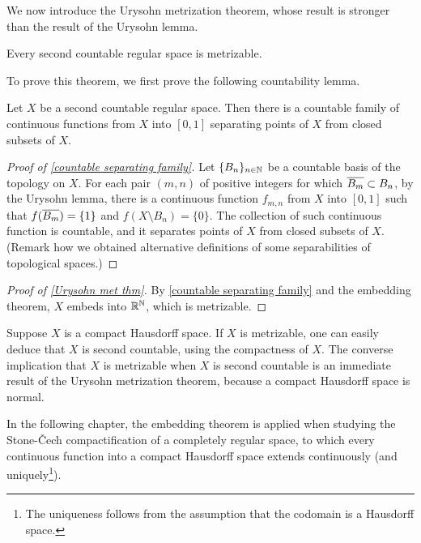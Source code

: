 We now introduce the Urysohn metrization theorem, whose result is stronger than the result of the Urysohn lemma.
\begin{thm}\label{Urysohn met thm}
    Every second countable regular space is metrizable.
\end{thm}
To prove this theorem, we first prove the following countability lemma.
\begin{lem}\label{countable separating family}
    Let $X$ be a second countable regular space.
    Then there is a countable family of continuous functions from $X$ into $[0, 1]$ separating points of $X$ from closed subsets of $X$.
\end{lem}
\begin{proof}[Proof of \cref{countable separating family}]
    Let $\{B_n\}_{n\in{\mathbb{N}}}$ be a countable basis of the topology on $X$.
    For each pair $(m, n)$ of positive integers for which $\overline{B_m}\subset B_n$, by the Urysohn lemma, there is a continuous function $f_{m, n}$ from $X$ into $[0, 1]$ such that $f(\overline{B_m})=\{1\}$ and $f(X\setminus B_n)=\{0\}$.
    The collection of such continuous function is countable, and it separates points of $X$ from closed subsets of $X$. (Remark how we obtained alternative definitions of some separabilities of topological spaces.)
\end{proof}
\begin{proof}[Proof of \cref{Urysohn met thm}]
    By \cref{countable separating family} and the embedding theorem, $X$ embeds into ${\mathbb{R}}^{\mathbb{N}}$, which is metrizable.
\end{proof}

\begin{exmp}
    Suppose $X$ is a compact Hausdorff space.
    If $X$ is metrizable, one can easily deduce that $X$ is second countable, using the compactness of $X$.
    The converse implication that $X$ is metrizable when $X$ is second countable is an immediate result of the Urysohn metrization theorem, because a compact Hausdorff space is normal.
\end{exmp}

In the following chapter, the embedding theorem is applied when studying the Stone-\v{C}ech compactification of a completely regular space, to which every continuous function into a compact Hausdorff space extends continuously (and uniquely\footnote{The uniqueness follows from the assumption that the codomain is a Hausdorff space.}).